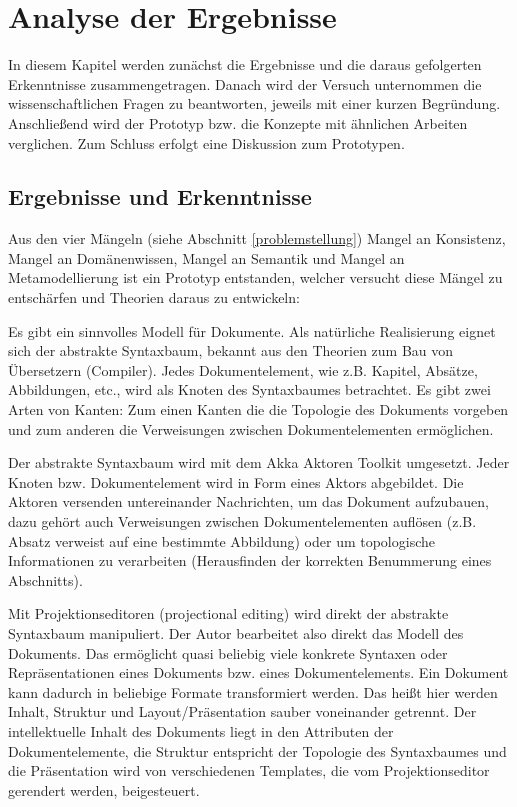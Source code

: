  
\chapter{Analyse der Ergebnisse}\label{}
 
In diesem Kapitel werden zunächst die Ergebnisse und die daraus gefolgerten Erkenntnisse zusammengetragen. Danach wird der Versuch unternommen die wissenschaftlichen Fragen zu beantworten, jeweils mit einer kurzen Begründung. Anschließend wird der Prototyp bzw. die Konzepte mit ähnlichen Arbeiten verglichen. Zum Schluss erfolgt eine Diskussion zum Prototypen.

 
\section{Ergebnisse und Erkenntnisse}\label{}
 
Aus den vier Mängeln (siehe Abschnitt \ref{problemstellung}) Mangel an Konsistenz, Mangel an Domänenwissen, Mangel an Semantik und Mangel an Metamodellierung ist ein Prototyp entstanden, welcher versucht diese Mängel zu entschärfen und Theorien daraus zu entwickeln:

 
Es gibt ein sinnvolles Modell für Dokumente. Als natürliche Realisierung eignet sich der abstrakte Syntaxbaum, bekannt aus den Theorien zum Bau von Übersetzern (Compiler). Jedes Dokumentelement, wie z.B. Kapitel, Absätze, Abbildungen, etc., wird als Knoten des Syntaxbaumes betrachtet. Es gibt zwei Arten von Kanten: Zum einen Kanten die die Topologie des Dokuments vorgeben und zum anderen die Verweisungen zwischen Dokumentelementen ermöglichen.

 
Der abstrakte Syntaxbaum wird mit dem Akka Aktoren Toolkit umgesetzt. Jeder Knoten bzw. Dokumentelement wird in Form eines Aktors abgebildet. Die Aktoren versenden untereinander Nachrichten, um das Dokument aufzubauen, dazu gehört auch Verweisungen zwischen Dokumentelementen auflösen (z.B. Absatz verweist auf eine bestimmte Abbildung) oder um topologische Informationen zu verarbeiten (Herausfinden der korrekten Benummerung eines Abschnitts).

 
Mit Projektionseditoren (projectional editing) wird direkt der abstrakte Syntaxbaum manipuliert. Der Autor bearbeitet also direkt das Modell des Dokuments. Das ermöglicht quasi beliebig viele konkrete Syntaxen oder Repräsentationen eines Dokuments bzw. eines Dokumentelements. Ein Dokument kann dadurch in beliebige Formate transformiert werden. Das heißt hier werden Inhalt, Struktur und Layout/Präsentation sauber voneinander getrennt. Der intellektuelle Inhalt des Dokuments liegt in den Attributen der Dokumentelemente, die Struktur entspricht der Topologie des Syntaxbaumes und die Präsentation wird von verschiedenen Templates, die vom Projektionseditor gerendert werden, beigesteuert.

